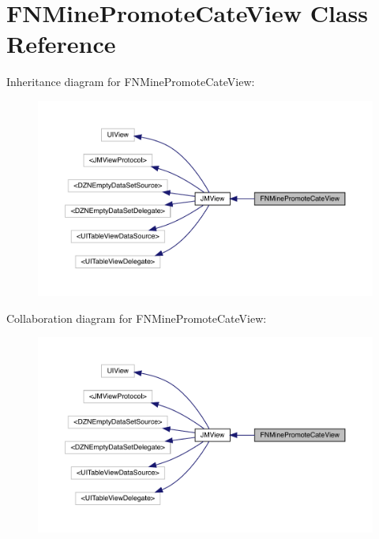 \hypertarget{interface_f_n_mine_promote_cate_view}{}\section{F\+N\+Mine\+Promote\+Cate\+View Class Reference}
\label{interface_f_n_mine_promote_cate_view}


Inheritance diagram for F\+N\+Mine\+Promote\+Cate\+View\+:\nopagebreak
\begin{figure}[H]
\begin{center}
\leavevmode
\includegraphics[width=350pt]{interface_f_n_mine_promote_cate_view__inherit__graph}
\end{center}
\end{figure}


Collaboration diagram for F\+N\+Mine\+Promote\+Cate\+View\+:\nopagebreak
\begin{figure}[H]
\begin{center}
\leavevmode
\includegraphics[width=350pt]{interface_f_n_mine_promote_cate_view__coll__graph}
\end{center}
\end{figure}

